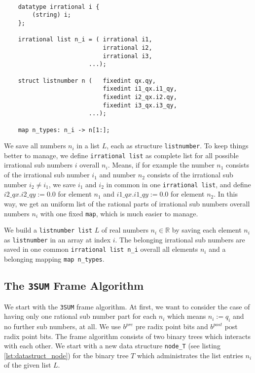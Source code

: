 \begin{lstlisting}[caption={Data type \texttt{irrational}, data structure \texttt{listnumber} and mapping \texttt{map} from a list of irrational numbers to n}, label=lst:datastruct_listnumber]

    datatype irrational i {
        (string) i;
    };

    irrational list n_i = ( irrational i1,
                            irrational i2,
                            irrational i3,
                        ...);    

    struct listnumber n (   fixedint qx.qy,
                            fixedint i1_qx.i1_qy,
                            fixedint i2_qx.i2.qy,
                            fixedint i3_qx.i3_qy,
                        ...);

    map n_types: n_i -> n[1:];

\end{lstlisting}


We save all numbers $n_{i}$ in a list $L$, each as structure \texttt{listnumber}. To keep things better to manage, we define \texttt{irrational list} as complete list for all possible irrational sub numbers $i$ overall $n_{i}$. Means, if for example the number $n_{1}$ consists of the irrational sub number $i_{1}$ and number $n_{2}$ consists of the irrational sub number $i_{2} \neq i_{1}$, we save $i_{1}$ and $i_{2}$ in common in one \texttt{irrational list}, and define $i2\_qx.i2\_qy := 0.0$ for element $n_{1}$ and $i1\_qx.i1\_qy := 0.0$ for element $n_{2}$. In this way, we get an uniform list of the rational parts of irrational sub numbers overall numbers $n_{i}$ with one fixed \texttt{map}, which is much easier to manage.


\begin{step}
    We build a \texttt{listnumber list} $L$ of real numbers $n_{i} \in \mathbb{R}$ by saving each element $n_{i}$ as \texttt{listnumber} in an array at index $i$. The belonging irrational sub numbers are saved in one common \texttt{irrational list n\_i} overall all elements $n_{i}$ and a belonging mapping \texttt{map n\_types}.
\label{step:savinglistelements}
\end{step}
\subsection{The \texttt{3SUM} Frame Algorithm}
\label{ss:the3sumframealgorithm}
We start with the \texttt{3SUM} frame algorithm. At first, we want to consider the case of having only one rational sub number part for each $n_{i}$ which means $n_{i} := q_{i}$ and no further sub numbers, at all. We use $b^{pre}$ pre radix point bits and $b^{post}$ post radix point bits. The frame algorithm consists of two binary trees which interacts with each other. We start with a new data structure \texttt{node\_T} (see listing \ref{lst:datastruct_node}) for the binary tree $T$ which administrates the list entries $n_{i}$ of the given list $L$.



